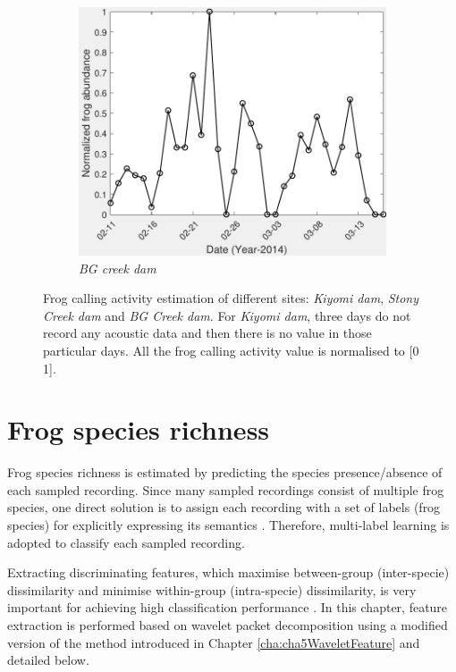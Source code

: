 \begin{figure}[htb!]
               ~
              \begin{subfigure}[b]{0.3\textwidth}
                \includegraphics[width=\textwidth]{image/Ch7/abundance1079.pdf}     
                \caption{\textit{BG creek dam}}           
        \end{subfigure}       
\caption[Frog calling activity detection of different sites]{Frog calling activity estimation of different sites: \textit{Kiyomi dam}, \textit{Stony Creek dam} and \textit{BG Creek dam}. For \textit{Kiyomi dam}, three days do not record any acoustic data and then there is no value in those particular days. All the frog calling activity value is normalised to [0 1].}
        \label{fig:frogAbundance}
\end{figure}




\section{Frog species richness}


Frog species richness is estimated by predicting the species presence/absence of each sampled recording. Since many sampled recordings consist of multiple frog species, one direct solution is to assign each recording with a set of labels (frog species) for explicitly expressing its semantics \citep{ZhangReview2014}. Therefore, multi-label learning is adopted to classify each sampled recording. 

Extracting discriminating features, which maximise between-group (inter-specie) dissimilarity
and minimise within-group (intra-specie) dissimilarity, is very important for achieving high classification performance \citep{huang2009frog, bedoya2014automatic}. In this chapter, feature extraction is performed based on wavelet packet decomposition using a modified version of the method introduced in Chapter \ref{cha:cha5WaveletFeature} and detailed below. 

